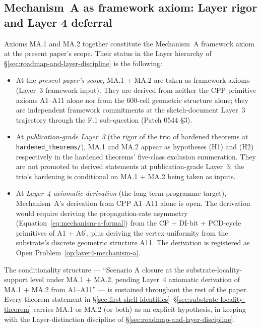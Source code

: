 \documentclass[11pt,letterpaper]{article}
\begin{document}
\subsection{Mechanism~A as framework axiom: Layer rigor and Layer 4 deferral}
\label{sec:mechanism-a-layer-status}

Axioms MA.1 and MA.2 together constitute the Mechanism~A framework axiom at the present paper's scope. Their status in the Layer hierarchy of \S\ref{sec:roadmap-and-layer-discipline} is the following:

\begin{itemize}[leftmargin=2em]
\item At the \emph{present paper's scope}, MA.1 + MA.2 are taken as framework axioms (Layer~3 framework input). They are derived from neither the CPP primitive axioms A1--A11 alone nor from the 600-cell geometric structure alone; they are independent framework commitments at the sketch-document Layer~3 trajectory through the F.1 sub-question (Patch 0544 \S3).
\item At \emph{publication-grade Layer~3} (the rigor of the trio of hardened theorems at \texttt{hardened\_theorems/}), MA.1 and MA.2 appear as hypotheses (H1) and (H2) respectively in the hardened theorems' five-class exclusion enumeration. They are not promoted to derived statements at publication-grade Layer~3; the trio's hardening is conditional on MA.1 + MA.2 being taken as inputs.
\item At \emph{Layer~4 axiomatic derivation} (the long-term programme target), Mechanism~A's derivation from CPP A1--A11 alone is open. The derivation would require deriving the propagation-rate asymmetry (Equation~\eqref{eq:mechanism-a-formal}) from the CP + DI-bit + PCD-cycle primitives of A1 + A6$^{\prime}$, plus deriving the vertex-uniformity from the substrate's discrete geometric structure A11. The derivation is registered as Open Problem~\ref{op:layer4-mechanism-a}.
\end{itemize}

The conditionality structure --- ``Scenario A closure at the substrate-locality-support level under MA.1 + MA.2, pending Layer~4 axiomatic derivation of MA.1 + MA.2 from A1--A11'' --- is sustained throughout the rest of the paper. Every theorem statement in \S\ref{sec:first-shell-identities}--\S\ref{sec:substrate-locality-theorem} carries MA.1 or MA.2 (or both) as an explicit hypothesis, in keeping with the Layer-distinction discipline of \S\ref{sec:roadmap-and-layer-discipline}.
\end{document}
